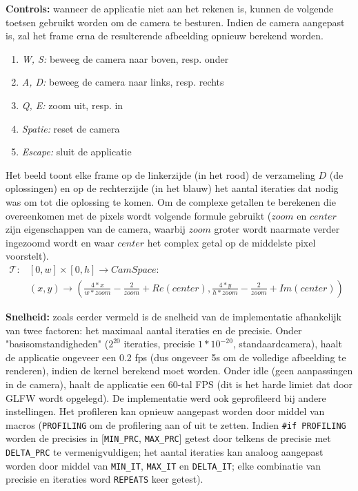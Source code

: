 \documentclass{article}
\begin{document}
\textbf{Controls:} wanneer de applicatie niet aan het rekenen is, kunnen de volgende toetsen gebruikt worden om de camera te besturen. Indien de camera aangepast is, zal het frame erna de resulterende afbeelding opnieuw berekend worden.
\begin{enumerate}
 \item \textit{W, S:} beweeg de camera naar boven, resp. onder
 \item \textit{A, D:} beweeg de camera naar links, resp. rechts
 \item \textit{Q, E:} zoom uit, resp. in
 \item \textit{Spatie:} reset de camera
 \item \textit{Escape:} sluit de applicatie
\end{enumerate}
Het beeld toont elke frame op de linkerzijde (in het rood) de verzameling $D$ (de oplossingen) en op de rechterzijde (in het blauw) het aantal iteraties dat nodig was om tot die oplossing te komen.
Om de complexe getallen te berekenen die overeenkomen met de pixels wordt volgende formule gebruikt ($zoom$ en $center$ zijn eigenschappen van de camera, waarbij $zoom$ groter wordt naarmate verder ingezoomd wordt en waar $center$ het complex getal op de middelste pixel voorstelt).
\begin{align*}
 \mathcal{T}: &[0, w]\times[0, h] \to CamSpace:& \\
 &(x, y) \to (\frac{4 * x}{w * zoom} - \frac{2}{zoom} + Re(center), \frac{4 *y}{h * zoom} - \frac{2}{zoom} + Im(center))
\end{align*}

\textbf{Snelheid:} zoals eerder vermeld is de snelheid van de implementatie afhankelijk van twee factoren: het maximaal aantal iteraties en de precisie. Onder "basisomstandigheden" ($2^{20}$ iteraties, precisie $1 * 10^{-20}$, standaardcamera), haalt de applicatie ongeveer een 0.2 fps (dus ongeveer 5s om de volledige afbeelding te renderen), indien de kernel berekend moet worden. Onder idle (geen aanpassingen in de camera), haalt de applicatie een 60-tal FPS (dit is het harde limiet dat door GLFW wordt opgelegd). De implementatie werd ook geprofileerd bij andere instellingen. Het profileren kan opnieuw aangepast worden door middel van macros (\verb|PROFILING| om de profilering aan of uit te zetten. Indien \verb|#if PROFILING| worden de precisies in [\verb|MIN_PRC|, \verb|MAX_PRC|] getest door telkens de precisie met \verb|DELTA_PRC| te vermenigvuldigen; het aantal iteraties kan analoog aangepast worden door middel van \verb|MIN_IT|, \verb|MAX_IT| en \verb|DELTA_IT|; elke combinatie van precisie en iteraties word \verb|REPEATS| keer getest).
\end{document}
